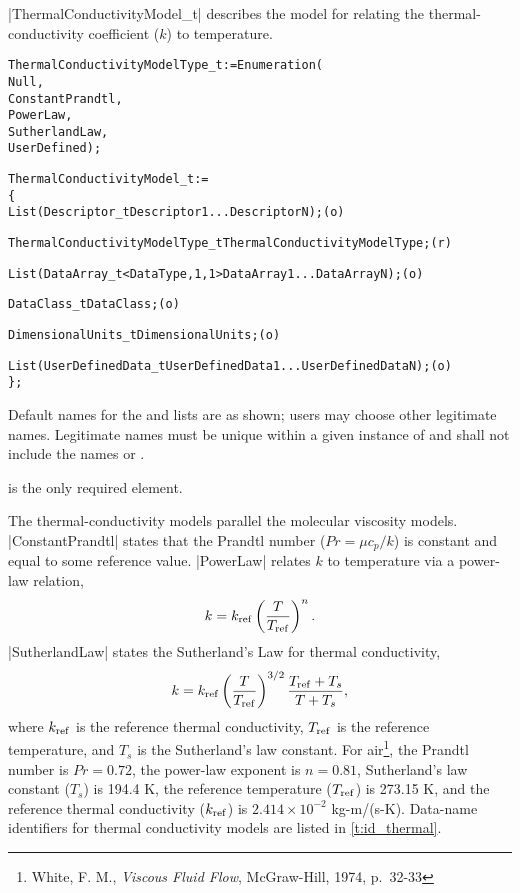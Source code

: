 |ThermalConductivityModel_t| describes the model for relating the
thermal-conductivity coefficient ($k$) to temperature.
\begin{alltt}
  ThermalConductivityModelType\_t := Enumeration(
    Null,
    ConstantPrandtl,
    PowerLaw,
    SutherlandLaw,
    UserDefined ) ;

  ThermalConductivityModel\_t :=
    \{
    List( Descriptor\_t Descriptor1 ... DescriptorN ) ;                      (o)

    ThermalConductivityModelType\_t ThermalConductivityModelType ;           (r)
    
    List( DataArray\_t<DataType, 1, 1> DataArray1 ... DataArrayN ) ;         (o)

    DataClass\_t DataClass ;                                                 (o)
                
    DimensionalUnits\_t DimensionalUnits ;                                   (o)

    List( UserDefinedData\_t UserDefinedData1 ... UserDefinedDataN ) ;       (o)
    \} ;
\end{alltt}

\begin{notes}
\item
 Default names for the  and 
 lists are as shown; users may choose other legitimate names.
 Legitimate names must be unique within a given instance of
  and shall not include the names
  or .
\item
  is the only required element.
\end{notes}

The thermal-conductivity models parallel the molecular viscosity models.
|ConstantPrandtl| states that the Prandtl number ($Pr = \mu c_p/k$) is
constant and equal to some reference value.
|PowerLaw| relates $k$ to temperature via a power-law relation,
$$
 k = k_{\rm ref} \left( T \over T_{\rm ref} \right)^n.
$$
|SutherlandLaw| states the Sutherland's Law for thermal conductivity,
$$
 k = k_{\rm ref} \left( T \over T_{\rm ref} \right)^{3/2} 
  {T_{\rm ref} + T_s \over T + T_s},
$$
where $k_{\rm ref}$ is the reference thermal conductivity, $T_{\rm ref}$
is the reference temperature, and $T_s$ is the Sutherland's law constant.
For air\footnote{White, F. M., {\it Viscous Fluid Flow}, McGraw-Hill, 1974,
p.~32-33}, the Prandtl number is $Pr = 0.72$, the power-law exponent is
$n = 0.81$, Sutherland's law constant ($T_s$) is 194.4 K, the reference
temperature ($T_{\rm ref}$) is 273.15 K, and the reference thermal
conductivity ($k_{\rm ref}$) is $2.414 \!\times\! 10^{-2}$ kg-m/(s-K).  
Data-name identifiers for thermal conductivity models are listed in
\autoref{t:id_thermal}.

